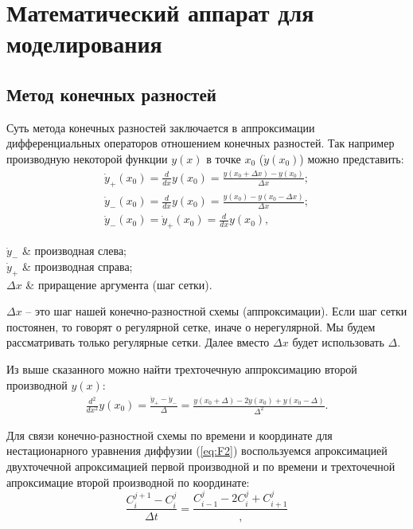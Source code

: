 \chapter{Математический аппарат для моделирования}

\section{Метод конечных разностей}
Суть метода конечных разностей заключается в аппроксимации дифференциальных операторов отношением конечных разностей. Так например производную некоторой функции $y(x)$ в точке $x_{0}$ ($\dot{y}(x_{0})$) можно представить:
\begin{gather}
	\dot{y}_{+}(x_{0}) = \frac{d}{dx}y(x_{0}) = \frac{y(x_{0} + \Delta x) - y(x_{0})}{\Delta x };\\
	\dot{y}_{-}(x_{0}) = \frac{d}{dx}y(x_{0}) = \frac{ y(x_{0}) - y(x_{0} - \Delta x)}{\Delta x };\\
	\dot{y}_{-}(x_{0}) = \dot{y}_{+}(x_{0}) = \frac{d}{dx}y(x_{0}),
\end{gather}
\begin{conditions}
	$\dot{y}_{-}$ & производная слева;\\
	$\dot{y}_{+}$ & производная справа;\\
	$\Delta x$ & приращение аргумента (шаг сетки).
\end{conditions}

$\Delta x$ -- это шаг нашей конечно-разностной схемы (аппроксимации). Если шаг сетки постоянен, то говорят о регулярной сетке, иначе о нерегулярной. Мы будем рассматривать только регулярные сетки. Далее вместо $\Delta x$ будет использовать $\Delta$.

Из выше сказанного можно найти трехточечную аппроксимацию второй производной $y(x)$:
\begin{gather}
	\frac{d^{2}}{dx^{2}}y(x_{0}) = \frac{\dot{y}_{+} - \dot{y}_{-}}{\Delta} = \frac{y(x_{0} + \Delta) - 2y(x_{0}) + y(x_{0} - \Delta)}{ \Delta^{2}}.
\end{gather}

Для связи конечно-разностной схемы по времени и координате для нестационарного уравнения диффузии (\ref{eq:F2}) воспользуемся апроксимацией двухточечной апроксимацией первой производной и по времени и трехточечной апроксимацие второй производной по координате: 
\begin{equation}
	\label{eq:xt}
	\frac{C^{j+1}_{i} - C^{j}_{i}}{\Delta t} = \frac{C^{j}_{i-1} - 2C^{j}_{i} + C^{j}_{i+1}},
\end{equation}

